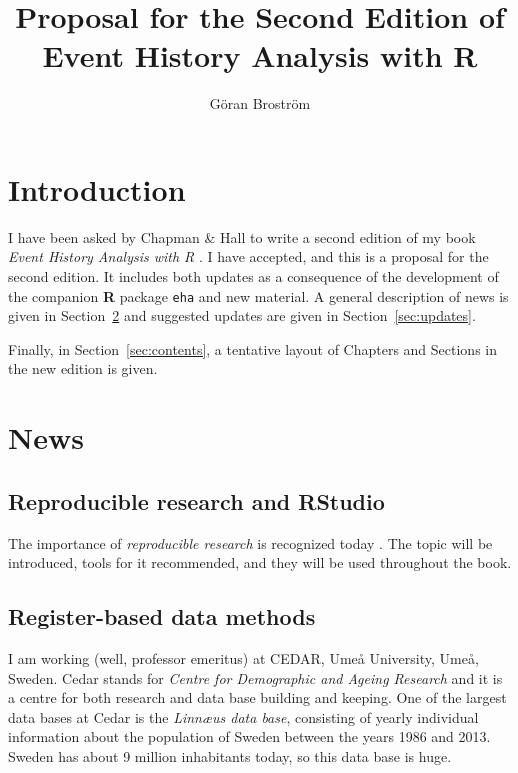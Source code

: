 \documentclass[a4paper,11pt]{article}
\title{Proposal for the Second Edition of \\
  Event History Analysis with R}
\author{Göran Broström}
\begin{document}
\maketitle

\tableofcontents

\section{Introduction}

I have been asked by Chapman \& Hall to write a second edition of my book
\emph{Event History Analysis with R} \citep{ehar12}. I have accepted, and
this is a proposal for the second edition. It includes both updates as a
consequence of the development of the companion {\bf R} \citep{cran}
package {\tt eha} \citep{eha} and new material. A general description of
news is given in Section~\ref{sec:news} and suggested updates are given in
Section~\ref{sec:updates}.

Finally, in Section~\ref{sec:contents}, a tentative layout of Chapters and
Sections in the new edition is given.

\section{News} \label{sec:news}

\subsection{Reproducible research and RStudio}

The importance of \emph{reproducible research} is recognized today
\citep{gandrud15,vsflrp}. The topic will be introduced,  tools for it
recommended, and they will be used throughout the book. 

\subsection{Register-based data methods}

I am working (well, professor emeritus) at {\sc CEDAR}, Umeå University,
Umeå, Sweden. {\sc Cedar} 
stands for  \emph{Centre for Demographic and Ageing Research} and it is a
centre for both research and data base building and keeping. One of the
largest data bases at {\sc Cedar} is the \emph{Linn{\ae}us data base},
consisting of yearly individual information about the population of Sweden
between the years 1986 and 2013. Sweden has about 9 million inhabitants
today, so this data base is huge.
\end{document}
